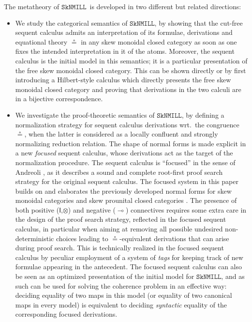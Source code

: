 \documentclass[copyright,creativecommons]{eptcs}
\theoremstyle{definition}
\newcommand{\ot}{\otimes}
\newcommand{\lolli}{\multimap}
\newcommand{\I}{\mathsf{I}}
\newcommand{\SkNMILL}{$\mathtt{SkNMILL}$}
\begin{document}
The metatheory of \SkNMILL\ is developed in two different but related directions:
\begin{itemize}
  \item We study the categorical semantics of \SkNMILL, by showing that the cut-free sequent calculus admits an interpretation of its formulae, derivations and equational theory $\circeq$ in any skew monoidal closed category as soon as one fixes the intended interpretation in it of the atoms. Moreover, the sequent calculus is the initial model in this semantics; it is a particular presentation of the free skew monoidal closed category. This can be shown directly or by first introducing a Hilbert-style calculus which directly presents the free skew monoidal closed category and proving that derivations in the two calculi are in a bijective correspondence.

\item We investigate the proof-theoretic semantics of \SkNMILL, by defining a normalization strategy for sequent calculus derivations wrt.\ the congruence $\circeq$, when the latter is considered as a locally confluent and strongly normalizing reduction relation. The shape of normal forms is made explicit in a new \emph{focused} sequent calculus, whose derivations act as the target of the normalization procedure. The sequent calculus is ``focused'' in the sense of Andreoli \cite{andreoli:logic:1992}, as it describes a sound and complete root-first proof search strategy for the original sequent calculus. The focused system in this paper builds on and elaborates the previously
developed normal forms for skew monoidal categories \cite{uustalu:sequent:2021} and skew prounital closed categories \cite{uustalu:deductive:nodate}. The presence of both positive ($\I$,$\ot$) and negative ($\lolli$) connectives requires some extra care in the design of the proof search strategy, reflected in the focused sequent calculus, in particular when aiming at removing all possible undesired non-deterministic choices leading to $\circeq$-equivalent derivations that can arise during proof search. This is technically realized in the focused sequent calculus by peculiar employment of a system of \emph{tags} for keeping track of new formulae appearing in the antecedent. The focused sequent calculus can also be seen as an optimized presentation of the initial model for \SkNMILL, and as such can be used for solving the coherence problem in an effective way: deciding equality of two maps in this model (or equality of two canonical maps in every model) is equivalent to deciding \emph{syntactic} equality of the corresponding focused derivations.
\end{itemize}
\end{document}
